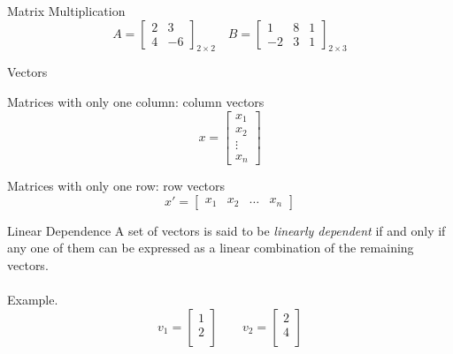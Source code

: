 \documentclass{./../../Latex/teaching_slides}
\begin{document}
\begin{frame}{Matrix Multiplication}
$$A = \begin{bmatrix}
2 & 3  \\
4 & -6 
\end{bmatrix}_{2 \times 2} \quad B = \begin{bmatrix}
1 & 8 & 1\\
-2 & 3 & 1
\end{bmatrix}_{2 \times 3}$$
\end{frame}


\begin{frame}{Vectors}
\begin{witemize}
\item Matrices with only one column: column vectors 
$$ x =  \begin{bmatrix}
x_1\\
x_2 \\
\vdots \\
x_n
\end{bmatrix} $$
\item Matrices with only one row: row vectors
$$ x' =  \begin{bmatrix}
x_1 &
x_2 & \hdots &
x_n
\end{bmatrix} $$
\end{witemize}
\end{frame}


\begin{frame}{Linear Dependence}
A set of vectors is said to be \textit{linearly dependent} if and only if any one of them can be expressed as a linear combination of the remaining vectors. \\~\\
Example.$$ v_1 =  \begin{bmatrix}
1\\
2 \\
\end{bmatrix} \quad \quad v_2 = \begin{bmatrix}
2\\
4 \\
\end{bmatrix}$$
\end{frame}
\end{document}
